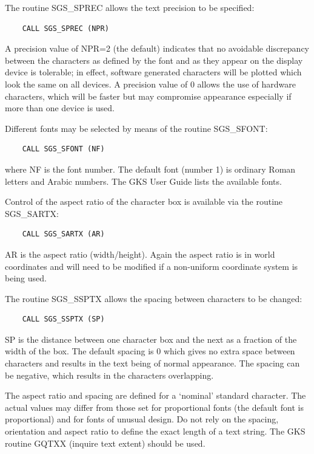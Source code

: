 \documentclass[11pt]{article}
\newcommand{\htmlref}[2]{#1}
\begin{document}
The routine
\htmlref{SGS\_SPREC}{SGS_SPREC} allows the text precision to be specified:
\begin{verbatim}
    CALL SGS_SPREC (NPR)
\end{verbatim}
A precision value of NPR=2 (the default) indicates that no avoidable
discrepancy between the characters as defined by the font and as
they appear on the display device is tolerable;  in effect, software
generated characters will be plotted which look the same on all
devices.  A precision value of 0 allows the use of hardware
characters, which will be faster but may compromise appearance
especially if more than one device is used.

Different fonts may
be selected by means of the routine \htmlref{SGS\_SFONT}{SGS_SFONT}:
\begin{verbatim}
    CALL SGS_SFONT (NF)
\end{verbatim}
where NF is the font number.  The default font (number 1) is ordinary Roman
letters and Arabic numbers.  The GKS User Guide lists the available fonts.

Control of the aspect ratio of the character box is available
via the routine \htmlref{SGS\_SARTX}{SGS_SARTX}:
\begin{verbatim}
    CALL SGS_SARTX (AR)
\end{verbatim}
AR is the aspect ratio (width/height).  Again the aspect ratio is in world
coordinates and will need to be modified if a non-uniform coordinate system
is being used.

The routine \htmlref{SGS\_SSPTX}{SGS_SSPTX}
allows the spacing between characters to be changed:
\begin{verbatim}
    CALL SGS_SSPTX (SP)
\end{verbatim}
SP is the distance between one character box and the next as
a fraction of the width of the box.  The default spacing is 0 which
gives no extra space between characters and results in the text being
of normal appearance.  The spacing can be negative, which results in the
characters overlapping.

The aspect ratio and spacing are defined for a `nominal' standard
character.  The actual values may differ from those set for proportional fonts
(the default font is proportional) and for fonts of unusual design.  Do
not rely on the spacing, orientation and aspect ratio to define
the exact length
of a text string.  The GKS routine GQTXX (inquire text extent) should be
used.
\end{document}
